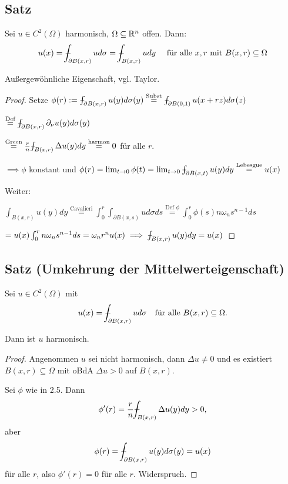 \subsection{Satz}

Sei $u \in C^2(\Omega)$ harmonisch, $\Omega \subseteq \mathbb{R}^n$ offen.
Dann:
$$
u(x) = \dashint_{\partial B(x,r)} u d\sigma = \dashint_{B(x,r)} u dy\quad\text{ für alle } x,r \text{ mit } B(x,r) \subseteq \Omega
$$

\begin{bem}
  Außergewöhnliche Eigenschaft, vgl. Taylor.
\end{bem}

\begin{proof}
  Setze
  $ \phi(r) := \dashint_{\partial B(x,r)} u(y) d\sigma(y) \overset{\text{Subst}}{=} \dashint_{\partial B(0,1)} u(x + rz) d\sigma(z)$ 
  
  $\overset{\text{Def}}{=} \dashint_{\partial B(x,r)} \partial_\nu u(y) d\sigma(y)$

  $\overset{\text{Green}}{=} \frac{r}{n} \dashint_{B(x,r)} \Delta u(y) dy \overset{\text{harmon}}{=} 0$ für alle $r$.

  $\implies \phi$ konstant und $\phi(r) = \lim_{t \to 0} \phi(t) = \lim_{t \to 0} \dashint_{\partial B(x,t)} u(y) dy \overset{\text{Lebesgue}}{=} u(x)$

  Weiter:

  $\int_{B(x,r)} u(y) dy \overset{\text{Cavalieri}}{=} \int_0^r \int_{\partial B(x,s)} u d\sigma ds \overset{\text{Def } \phi}{=} \int_0^r \phi(s)n \omega_n s^{n - 1} ds$

  $= u(x) \int_0^r n \omega_n s^{n - 1} ds = \omega_n r^n u(x) \implies \dashint_{B(x,r)} u(y) dy = u(x)$
\end{proof}

\subsection{Satz (Umkehrung der Mittelwerteigenschaft)}

Sei $u \in C^2(\Omega)$ mit
$$
u(x) = \dashint_{\partial B(x,r)} u d\sigma \quad\text{für alle } B(x,r) \subseteq \Omega.
$$

Dann ist $u$ harmonisch.

\begin{proof}
  Angenommen $u$ sei nicht harmonisch, dann $\Delta u \neq 0$ und es existiert $B(x,r) \subseteq \Omega$ mit oBdA $\Delta u > 0$ auf $B(x,r)$.

  Sei $\phi$ wie in 2.5. 
  Dann $$\phi'(r) = \frac{r}{n} \dashint_{B(x,r)} \Delta u(y) dy > 0,$$ aber $$\phi(r) = \dashint_{\partial B(x,r)} u(y) d\sigma(y) = u(x)$$ für alle $r$, also $\phi'(r) = 0$ für alle $r$.
  Widerspruch.
\end{proof}

